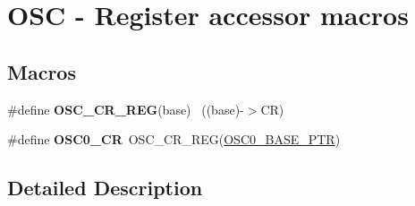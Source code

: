 \hypertarget{group___o_s_c___register___accessor___macros}{}\section{O\+S\+C -\/ Register accessor macros}
\label{group___o_s_c___register___accessor___macros}
\subsection*{Macros}
\begin{DoxyCompactItemize}
\item 
\hypertarget{group___o_s_c___register___accessor___macros_ga986cf8366f7686523f323c907f34222e}{}\#define {\bfseries O\+S\+C\+\_\+\+C\+R\+\_\+\+R\+E\+G}(base)                                              ~((base)-\/$>$C\+R)\label{group___o_s_c___register___accessor___macros_ga986cf8366f7686523f323c907f34222e}

\item 
\hypertarget{group___o_s_c___register___accessor___macros_ga55e7ae8d61b1c66e1c673163c8c0a10e}{}\#define {\bfseries O\+S\+C0\+\_\+\+C\+R}~O\+S\+C\+\_\+\+C\+R\+\_\+\+R\+E\+G(\hyperlink{group___o_s_c___peripheral_gaab1618c69a91b2e5d3385139b5b566f0}{O\+S\+C0\+\_\+\+B\+A\+S\+E\+\_\+\+P\+T\+R})\label{group___o_s_c___register___accessor___macros_ga55e7ae8d61b1c66e1c673163c8c0a10e}

\end{DoxyCompactItemize}


\subsection{Detailed Description}
